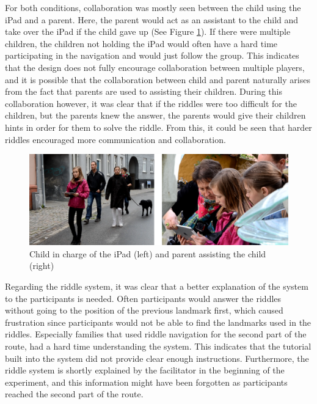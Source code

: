 For both conditions, collaboration was mostly seen between the child using the iPad and a parent. Here, the parent would act as an assistant to the child and take over the iPad if the child gave up (See Figure \ref{Communication2}). If there were multiple children, the children not holding the iPad would often have a hard time participating in the navigation and would just follow the group. This indicates that the design does not fully encourage collaboration between multiple players, and it is possible that the collaboration between child and parent naturally arises from the fact that parents are used to assisting their children. During this collaboration however, it was clear that if the riddles were too difficult for the children, but the parents knew the answer, the parents would give their children hints in order for them to solve the riddle. From this, it could be seen that harder riddles encouraged more communication and collaboration.

\begin{figure}[hbtp]
\centering
\includegraphics[scale=0.13]{Pics/exp2.png}
\caption{Child in charge of the iPad (left) and parent assisting the child (right)}
\label{Communication2}
\end{figure}

Regarding the riddle system, it was clear that a better explanation of the system to the participants is needed. Often participants would answer the riddles without going to the position of the previous landmark first, which caused frustration since participants would not be able to find the landmarks used in the riddles. Especially families that used riddle navigation for the second part of the route, had a hard time understanding the system. This indicates that the tutorial built into the system did not provide clear enough instructions. Furthermore, the riddle system is shortly explained by the facilitator in the beginning of the experiment, and this information might have been forgotten as participants reached the second part of the route. 


